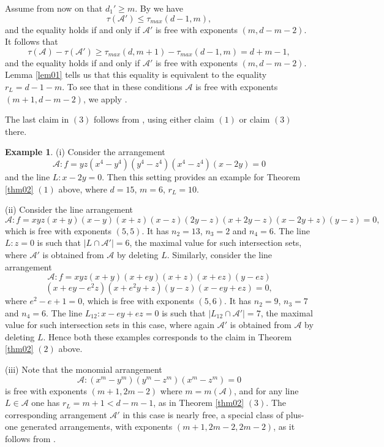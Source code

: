 \documentclass[12pt]{amsart}
\theoremstyle{plain}
\theoremstyle{definition}
\newtheorem{ex}[subsection]{Example}
\numberwithin{equation}{section}
\newcommand{\A}{{\mathcal A}}
\begin{document}
Assume from now on that $d_1' \geq m$. By \cite{dPCTC} we have
$$\tau(\A') \leq \tau_{max}(d-1,m),$$
and the equality holds if and only if $\A'$ is free with exponents $(m,d-m-2)$. 
It follows that
$$\tau(\A)-\tau(\A') \geq \tau_{max}(d,m+1)-\tau_{max}(d-1,m)=d+m-1,$$
and the equality holds if and only if $\A'$ is free with exponents $(m,d-m-2)$. Lemma \ref{lem01} tells us that this equality is equivalent to the equality $r_L=d-1-m$. To see that in these conditions $\A$ is free with exponents $(m+1,d-m-2)$, we apply \cite[Theorem 1.4 (2)]{POG}.

The last claim in $(3)$ follows from  \cite[Theorem 1.3]{POG}, using either claim $(1)$ or claim $(3)$ there.
\endproof

 \begin{ex}
\label{ex02}
(i) Consider the arrangement
$$\A: f=yz(x^4-y^4)(y^4-z^4)(x^4-z^4)(x-2y)=0$$
and the line $L:x-2y=0$. Then this setting provides an example for Theorem \ref{thm02} $(1)$ above, where $d=15$, $m=6$, $r_L=10$.

(ii) Consider the line arrangement
$$\A: f=xyz(x+y)(x-y)(x+z)(x-z)(2y-z)(x+2y-z)(x-2y+z)(y-z)=0,$$
which is free with exponents $(5,5)$. It has $n_2=13$, $n_3= 2$ and
$n_4=6$. The line $L:z=0$ is such that $|L \cap \A'|=6$, the maximal value for such intersection sets, where $\A'$ is obtained from $\A$ by deleting $L$. 
 Similarly, consider the line arrangement
$$\A: f=xyz(x+y)(x+ey)(x+z)(x+ez)(y-ez)$$
$$(x+ey-e^2z)(x+e^2y+z)(y-z)(x-ey+ez) =0,$$
where $e^2-e+1=0$,
which is free with exponents $(5,6)$. It has $n_2=9$, $n_3= 7$ and
$n_4=6$. The line $L_{12}:x-ey+ez=0$ is such that $|L_{12} \cap \A'|=7$, the maximal value for such intersection sets in this case, where again $\A'$ is obtained from $\A$ by deleting $L$.
Hence both these examples corresponds to the claim in Theorem \ref{thm02} $(2)$ above.


(iii) Note that the monomial arrangement
$$\A: (x^m-y^m)(y^m-z^m)(x^m-z^m)=0$$
is free with exponents $(m+1,2m-2)$ where $m=m(\A)$, and for any line $L \in \A$ one has $r_L=m+1<d-m-1$, as in Theorem \ref{thm02} $(3)$. The corresponding arrangement
$\A'$ in this case is nearly free, a special class of plus-one generated arrangements, with exponents $(m+1,2m-2,2m-2)$,
as it follows from \cite[Theorem 1.3 (3)]{POG}.

 \end{ex}
 
\end{document}
